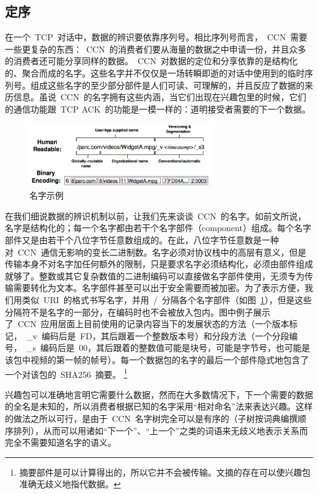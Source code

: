 	
\subsection{定序}
\label{sec:3.2}
在一个~TCP~对话中，数据的辨识要依靠序列号。相比序列号而言，~CCN~需要一些更复杂的东西：~CCN~的消费者们要从海量的数据之中申请一份，并且众多的消费者还可能分享同样的数据。~CCN~对数据的定位和分享依靠的是结构化的、聚合而成的名字。这些名字并不仅仅是一场转瞬即逝的对话中使用到的临时序列号。组成这些名字的至少部分部件是人们可读、可理解的，并且反应了数据的来历信息。虽说~CCN~的名字拥有这些内涵，当它们出现在兴趣包里的时候，它们的通信功能跟~TCP ACK~的功能是一模一样的：道明接受者需要的下一个数据。

\begin{figure}[htbp]
  \centering
  \includegraphics[width=0.7\textwidth]{images/name}
  \caption{名字示例} 
  \label{name}
\end{figure}

在我们细说数据的辨识机制以前，让我们先来谈谈~CCN~的名字。如前文所说，名字是结构化的；每一个名字都由若干个名字部件（component）组成。每个名字部件又是由若干个八位字节任意数组成的。在此，八位字节任意数是一种对~CCN~通信无影响的变长二进制数。名字必须对协议栈中的高层有意义，但是传输本身不对名字加任何额外的限制，只是要求名字必须结构化，必须由部件组成就够了。整数或其它复杂数值的二进制编码可以直接做名字部件使用，无须专为传输需要转化为文本。名字部件甚至可以出于安全需要而被加密。为了表示方便，我们用类似~URI~的格式书写名字，并用~\slash~分隔各个名字部件（如图~\ref{name}），但是这些分隔符不是名字的一部分，在编码时也不会被放入包内。图中例子展示了~CCN~应用层面上目前使用的记录内容当下的发展状态的方法（一个版本标记，~\_v~编码后是~FD，其后跟着一个整数版本号）和分段方法（一个分段编号，~\_s~编码后是~00，其后跟着的整数值可能是块号，可能是字节号，也可能是该包中视频的第一帧的帧号）。每一个数据包的名字的最后一个部件隐式地包含了一个对该包的~SHA256~摘要。
\renewcommand\baselinestretch{1} %
\footnote{摘要部件是可以计算得出的，所以它并不会被传输。文摘的存在可以使兴趣包准确无歧义地指代数据。} %

兴趣包可以准确地言明它需要什么数据，然而在大多数情况下，下一个需要的数据的全名是未知的，所以消费者根据已知的名字采用“相对命名”法来表达兴趣。这样的做法之所以可行，是由于~CCN~名字树完全可以是有序的（子树按词典编撰顺序排列），从而可以用诸如“下一个”、“上一个”之类的词语来无歧义地表示关系而完全不需要知道名字的语义。

